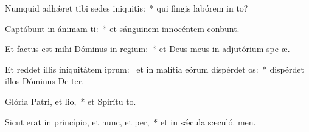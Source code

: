 \item Numquid adhǽret tibi sedes iniquitis:~* qui fingis labórem in to?
\item Captábunt in ánimam ti:~* et sánguinem innocéntem conbunt.
\item Et factus est mihi Dóminus in regium:~* et Deus meus in adjutórium spe æ.
\item Et reddet illis iniquitátem iprum:~\pscross{} et in malítia eórum dispérdet os:~* dispérdet illos Dóminus De ter.
\item Glória Patri, et lio,~* et Spirítu to.
\item Sicut erat in princípio, et nunc, et per,~* et in sǽcula sæculó. men.
